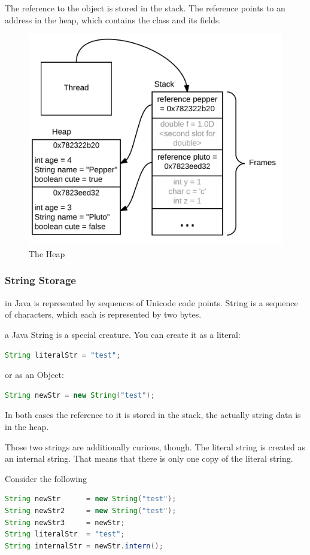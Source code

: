 The reference to the object is stored in the stack. The reference points to an address in the heap, which contains the class and its fields.\cite{gosling}
\begin{figure}[H]\centering
\includegraphics[width=0.9\linewidth]{images/heap}
\caption{The Heap}
\label{fig:stack}
\end{figure}
\subsubsection{String Storage} in Java is represented by sequences of Unicode code points. String is a sequence of characters, which each is represented by two bytes. 

a Java String is a special creature. You can create it as a literal:
\begin{lstlisting}[language=Java]
String literalStr = "test";
\end{lstlisting}
or as an Object:
\begin{lstlisting}[language=Java]
String newStr = new String("test");
\end{lstlisting}

In both cases the reference to it is stored in the stack, the actually string data is in the heap.

Those two strings are additionally curious, though. The literal string is created as an internal string. That means that there is only one copy of the literal string.

Consider the following
\begin{lstlisting}[language=Java]
String newStr      = new String("test");
String newStr2     = new String("test");
String newStr3     = newStr;
String literalStr  = "test";
String internalStr = newStr.intern();
\end{lstlisting}

